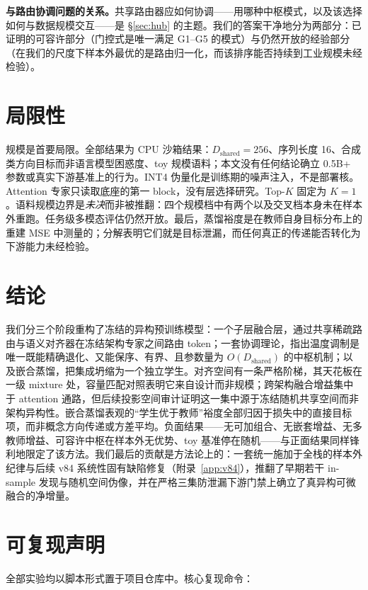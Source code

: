 \documentclass[10pt,twoside]{article}
\theoremstyle{definition}
\theoremstyle{plain}
\theoremstyle{remark}
\begin{document}
\textbf{与路由协调问题的关系。}共享路由器应如何协调——用哪种中枢模式，以及该选择如何与数据规模交互——是 \S\ref{sec:hub} 的主题。我们的答案干净地分为两部分：已证明的可容许部分（门控式是唯一满足 G1--G5 的模式）与仍然开放的经验部分（在我们的尺度下样本外最优的是路由归一化，而该排序能否持续到工业规模未经检验）。

\section{局限性}
\label{sec:limitations}

规模是首要局限。全部结果为 CPU 沙箱结果：$D_{\text{shared}}{=}256$、序列长度 16、合成类方向目标而非语言模型困惑度、toy 规模语料；本文没有任何结论确立 0.5B+ 参数或真实下游基准上的行为。INT4 伪量化是训练期的噪声注入，不是部署核。Attention 专家只读取底座的第一 block，没有层选择研究。Top-$K$ 固定为 $K{=}1$。语料规模边界是\emph{未决}而非被推翻：四个规模档中有两个以及交叉档本身未在样本外重跑。任务级多模态评估仍然开放。最后，蒸馏裕度是在教师自身目标分布上的重建 MSE 中测量的；分解表明它们就是目标泄漏，而任何真正的传递能否转化为下游能力未经检验。

\section{结论}
\label{sec:conclusion}

我们分三个阶段重构了冻结的异构预训练模型：一个子层融合层，通过共享稀疏路由与语义对齐器在冻结架构专家之间路由 token；一套协调理论，指出温度调制是唯一既能精确退化、又能保序、有界、且参数量为 $O(D_{\text{shared}})$ 的中枢机制；以及嵌合蒸馏，把集成坍缩为一个独立学生。对齐空间有一条严格阶梯，其天花板在一级 mixture 处，容量匹配对照表明它来自设计而非规模；跨架构融合增益集中于 attention 通路，但后续投影空间审计证明这一集中源于冻结随机共享空间而非架构异构性。嵌合蒸馏表观的``学生优于教师''裕度全部归因于损失中的直接目标项，而非概念方向传递或方差平均。负面结果——无可加组合、无嵌套增益、无多教师增益、可容许中枢在样本外无优势、toy 基准停在随机——与正面结果同样锋利地限定了该方法。我们最后的贡献是方法论上的：一套统一施加于全栈的样本外纪律与后续 v84 系统性固有缺陷修复（附录~\ref{app:v84}），推翻了早期若干 in-sample 发现与随机空间伪像，并在严格三集防泄漏下游门禁上确立了真异构可微融合的净增量。

\section*{可复现声明}
\label{sec:repro}

全部实验均以脚本形式置于项目仓库中。核心复现命令：
\end{document}
